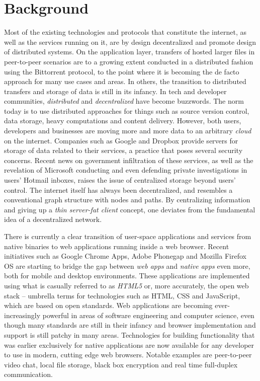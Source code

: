 \section{Background}
Most of the existing technologies and protocols that constitute the internet, as well as the services running on it, are by design decentralized and promote design of distributed systems. On the application layer, transfers of hosted larger files in peer-to-peer scenarios are to a growing extent conducted in a distributed fashion using the Bittorrent protocol, to the point where it is becoming the de facto approach for many use cases and areas. In others, the transition to distributed transfers and storage of data is still in its infancy. In tech and developer communities, \emph{distributed} and \emph{decentralized} have become buzzwords. The norm today is to use distributed approaches for things such as source version control, data storage, heavy computations and content delivery.
However, both users, developers and businesses are moving more and more data to an arbitrary \emph{cloud} on the internet. Companies such as Google and Dropbox provide servers for storage of data related to their services, a practice that poses several security concerns. Recent news on government infiltration of these services, as well as the revelation of Microsoft conducting and even defending private investigations in users' Hotmail inboxes, raises the issue of centralized storage beyond users' control. The internet itself has always been decentralized, and resembles a conventional graph structure with nodes and paths. By centralizing information and giving up a \emph{thin server-fat client} concept, one deviates from the fundamental idea of a decentralized network.

There is currently a clear transition of user-space applications and services from native binaries to web applications running inside a web browser. Recent initiatives such as Google Chrome Apps, Adobe Phonegap and Mozilla Firefox OS are starting to bridge the gap between \emph{web apps} and \emph{native apps} even more, both for mobile and desktop environments. These applications are implemented using what is casually referred to as \emph{HTML5} or, more accurately, the open web stack – umbrella terms for technologies such as HTML, CSS and JavaScript, which are based on open standards. Web applications are becoming ever-increasingly powerful in areas of software engineering and computer science, even though many standards are still in their infancy and browser implementation and support is still patchy in many areas. Technologies for building functionality that was earlier exclusively for native applications are now available for any developer to use in modern, cutting edge web browsers. Notable examples are peer-to-peer video chat, local file storage, black box encryption and real time full-duplex communication.

